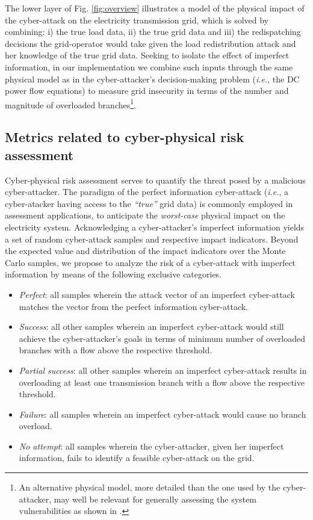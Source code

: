 \documentclass{IEEEtran4PSCC}
\begin{document}
The lower layer of Fig. \ref{fig:overview} illustrates a model of the physical impact of the cyber-attack on the electricity transmission grid, which is solved by combining: i) the true load data, ii) the true grid data and iii) the redispatching decisions the grid-operator would take given the load redistribution attack and her knowledge of the true grid data. Seeking to isolate the effect of imperfect information, in our implementation we combine such inputs through the same physical model as in the cyber-attacker's decision-making problem (\textit{i.e.}, the DC power flow equations) to measure grid insecurity in terms of the number and magnitude of overloaded branches\footnote{An alternative physical model, more detailed than the one used by the cyber-attacker, may well be relevant for generally assessing the system vulnerabilities as shown in \cite{liang2015}.}. 


\subsection{Metrics related to cyber-physical risk assessment}
\label{assess_metrics}

Cyber-physical risk assessment serves to quantify the threat posed by a malicious cyber-attacker. The paradigm of the perfect information cyber-attack (\textit{i.e.}, a cyber-atacker having access to the \emph{``true''} grid data) is commonly employed in assessment applications, to anticipate the \emph{worst-case} physical impact on the electricity system. Acknowledging a cyber-attacker's imperfect information yields a set of random cyber-attack samples and respective impact indicators. Beyond the expected value and  distribution of the impact indicators over the Monte Carlo samples, we propose to analyze the risk of a cyber-attack with imperfect information by means of the following exclusive categories.



\begin{itemize}
\item{\emph{Perfect}: all samples wherein the attack vector of an imperfect cyber-attack matches the vector from the perfect information cyber-attack.}
\item{\emph{Success}: all other samples wherein an imperfect cyber-attack would still achieve the cyber-attacker's goals in terms of minimum number of overloaded branches with a flow above the respective threshold.}
\item{\emph{Partial success}: all other samples wherein an imperfect cyber-attack results in overloading at least one transmission branch with a flow above the respective threshold.}
\item{\emph{Failure}: all samples wherein an imperfect cyber-attack would cause no branch overload.}
\item{\emph{No attempt}: all samples wherein the cyber-attacker, given her imperfect information, fails to identify a feasible cyber-attack on the grid.}
\end{itemize}
\end{document}
